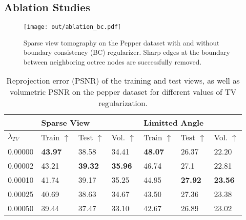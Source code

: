 \documentclass[acmtog,nonacm]{acmart} \acmSubmissionID{0438}
\begin{document}
\subsection{Ablation Studies}

\begin{figure}
\texttt{[image: out/ablation\_bc.pdf]}
	\caption{
		Sparse view tomography on the Pepper dataset with and without boundary consistency (BC) regularizer.
		Sharp edges at the boundary between neighboring octree nodes are successfully removed.
	}
	\label{fig:bc_reg}
\end{figure}

\begin{table}[]
\begin{tabular}{@{}l|lll|lll@{}}
\toprule
        & \multicolumn{3}{l|}{Sparse View} & \multicolumn{3}{l}{Limitted Angle} \\ \midrule
$\lambda_{TV}$        & Train   $\uparrow$        & Test    $\uparrow$        &       Vol. $\uparrow$   & Train       $\uparrow$      & Test   $\uparrow$      &       Vol. $\uparrow$       \\ \midrule
0.00000 & \textbf{43.97}  & 38.58     &  34.41   & \textbf{48.07}   & 26.37 & 22.20          \\
0.00002 & 43.21           & \textbf{39.32}  &  \textbf{35.96}  & 46.74            & 27.1 &22.81           \\
0.00010 & 41.74           & 39.17     &   35.25  & 44.95            & \textbf{27.92} & \textbf{23.56} \\
0.00025 & 40.69           & 38.63     &   34.67  & 43.50            & 27.36      & 23.38     \\
0.00050 & 39.44           & 37.47     &   33.10  & 42.67            & 26.89        & 23.02   \\ \bottomrule
\end{tabular}
\caption{ Reprojection error (PSNR) of the training and test views, as
  well as volumetric PSNR on the pepper dataset for different values of
  TV regularization.}
\label{tab:tvreg}
\end{table}
\end{document}
